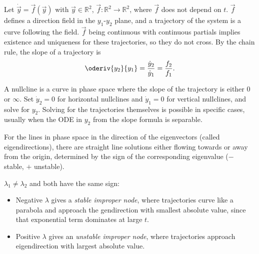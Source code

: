 \documentclass[10pt, a4paper]{article}
\begin{document}
\begin{landscape}
\begin{multicols}{2}
    Let \(\dot{\vec{y}} = \vec{f}(\vec{y})\) with \(\vec{y} \in \mathbb{R}^2\),
    \(\vec{f}: \mathbb{R}^2 \to \mathbb{R}^2\), where \(\vec{f}\) does not depend on \(t\).
    \(\vec{f}\) defines a direction field in
    the \(y_1\)-\(y_2\) plane, and a trajectory of the system is a curve following the
    field. \(\vec{f}\) being continuous with continuous partials implies existence and uniqueness
    for these trajectories, so they do not cross. By the chain rule, the slope of a trajectory is
    \[\oderiv{y_2}{y_1} = \frac{\dot y_2}{\dot y_1} = \frac{f_2}{f_1}.\]

    A nullcline is a curve in phase space where the slope of the trajectory is either 0 or \(\infty\).
    Set \(\dot y_2 = 0\) for horizontal nullclines and \(\dot y_1 = 0\) for vertical nullclines, and
    solve for \(y_2\). Solving for the trajectories themselves is possible in specific cases,
    usually when the ODE in \(y_2\) from the slope formula is separable.

    For the lines in phase space in the direction of the eigenvectors (called eigendirections),
    there are straight line solutions either flowing towards or away from the origin, determined
    by the sign of the corresponding eigenvalue (\(-\) stable, \(+\) unstable).
    
    \(\lambda_1 \neq \lambda_2\) and both have the same sign:
    \begin{itemize}
        \item Negative \(\lambda\) gives a \emph{stable improper node}, where
            trajectories curve like a parabola and approach the gendirection with smallest absolute value,
            since that exponential term dominates at large \(t\).
        \item Positive \(\lambda\) gives an
            \emph{unstable improper node}, where trajectories approach eigendirection with
            largest absolute value.
    \end{itemize}


\end{multicols}
\end{landscape}
\end{document}
